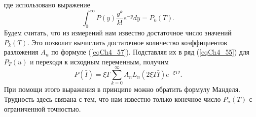 где использовано выражение  
\[
\int_0^{\infty}P\left(y\right)\frac{y^k}{k!}e^{-y}dy =
P_k\left(T\right). 
\]
Будем считать, что из измерений нам
известно достаточное число значений $P_k\left(T\right)$. Это позволит
вычислить достаточное количество коэффициентов разложения $A_n$ по
формуле (\ref{eqCh4_57}). Подставляя их в ряд (\ref{eqCh4_55}) для
$P_T\left(u\right)$ и переходя к исходным переменным, получим
\begin{equation}
P\left(\bar{I}\right) = \xi T\sum_{k = 0}^{\infty}
A_n L_n\left(2 \xi T \bar{I}\right)e^{- \xi T \bar{I}}.
\label{eqCh4_58}
\end{equation}
При помощи этого выражения в принципе можно обратить формулу
Манделя. Трудность здесь связана с тем, что нам известно только
конечное число $P_n\left(T\right)$ с ограниченной точностью. 

